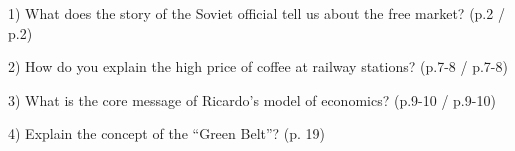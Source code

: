 1) What does the story of the Soviet official tell us about the free market? (p.2 / p.2)

2) How do you explain the high price of coffee at railway stations? (p.7-8 / p.7-8)

3) What is the core message of Ricardo’s model of economics? (p.9-10 / p.9-10)

4) Explain the concept of the “Green Belt”? (p. 19)